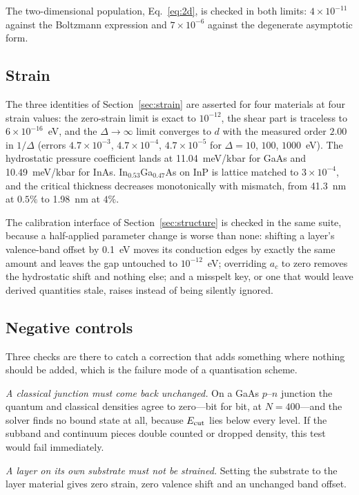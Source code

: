 \documentclass[preprint,12pt]{elsarticle}
\begin{document}
The two-dimensional population, Eq.~\eqref{eq:2d}, is checked in both limits:
$4\times10^{-11}$ against the Boltzmann expression and $7\times10^{-6}$ against
the degenerate asymptotic form.

\subsection{Strain}

The three identities of Section~\ref{sec:strain} are asserted for four
materials at four strain values: the zero-strain limit is exact to
$10^{-12}$, the shear part is traceless to $6\times10^{-16}$~eV, and the
$\Delta\to\infty$ limit converges to $d$ with the measured order $2.00$ in
$1/\Delta$ (errors $4.7\times10^{-3}$, $4.7\times10^{-4}$,
$4.7\times10^{-5}$ for $\Delta=10$, $100$, $1000$~eV). The hydrostatic
pressure coefficient lands at \SI{11.04}{meV/kbar} for GaAs and
\SI{10.49}{meV/kbar} for InAs. In$_{0.53}$Ga$_{0.47}$As on InP is lattice
matched to $3\times10^{-4}$, and the critical thickness decreases
monotonically with mismatch, from \SI{41.3}{nm} at $0.5\%$ to \SI{1.98}{nm} at
$4\%$.

The calibration interface of Section~\ref{sec:structure} is checked in the
same suite, because a half-applied parameter change is worse than none:
shifting a layer's valence-band offset by \SI{0.1}{eV} moves its conduction
edges by exactly the same amount and leaves the gap untouched to
$10^{-12}$~eV; overriding $a_c$ to zero removes the hydrostatic shift and
nothing else; and a misspelt key, or one that would leave derived quantities
stale, raises instead of being silently ignored.

\subsection{Negative controls}

Three checks are there to catch a correction that adds something where nothing
should be added, which is the failure mode of a quantisation scheme.

\emph{A classical junction must come back unchanged.} On a GaAs $p$--$n$
junction the quantum and classical densities agree to zero---bit for bit, at
$N=400$---and the solver finds no bound state at all, because
$E_{\rm cut}$ lies below every level. If the subband and continuum pieces
double counted or dropped density, this test would fail immediately.

\emph{A layer on its own substrate must not be strained.} Setting the
substrate to the layer material gives zero strain, zero valence shift and an
unchanged band offset.
\end{document}
